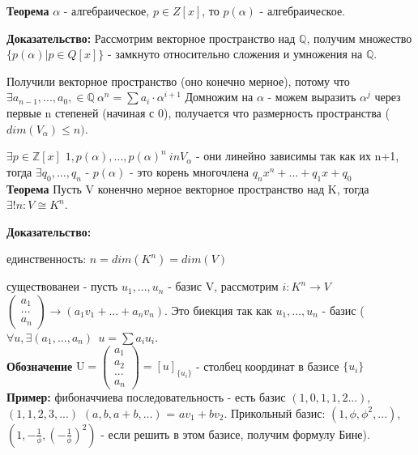 \documentclass[12pt]{article}
\begin{document}
\textbf{Теорема} $\alpha$ - алгебраическое, $ p \in Z[x]$, то  $p(\alpha)$ - алгебраическое.

\textbf{Доказательство:} Рассмотрим векторное пространство над $\mathbb{Q}$, получим множество $\{p(\alpha) | p \in Q[x]\}$ - замкнуто относительно сложения и умножения на $\mathbb{Q}$.

Получили векторное пространство (оно конечно мерное), потому что $\exists a_{n - 1}, ..., a_0, \in \mathbb{Q} \ \alpha^n = \sum {a_i \cdot \alpha^{i + 1}}$ Домножим на $\alpha$ - можем выразить $\alpha^j$ через первые n степеней (начиная с 0), получается что размерность пространства ($dim(V_{\alpha}) \leq n)$. 

$\exists p \in \mathbb{Z}[x]$ $1, p(\alpha), ..., p(\alpha)^n \ in V_{\alpha}$ - они линейно зависимы так как их n+1, тогда $\exists q_0, ..., q_n$ - $p(\alpha)$ - это корень многочлена $q_nx^n + ... + q_1x + q_0$
\\

\textbf{Теорема} Пусть V коненчно мерное векторное пространство над K, тогда $\exists !n : V \cong K^n$. 

\textbf{Доказательство:}

единственность: $n = dim(K^n) = dim(V)$ 

существованеи - пусть $u_1, ..., u_n$ - базис V, рассмотрим $i: K^n \rightarrow V$ $\begin{pmatrix}
    a_1 \\
    ... \\
    a_n
\end{pmatrix} \rightarrow (a_1v_1 + ... + a_nv_n)$. Это биекция так как $u_1, ..., u_n$ - базис ($\forall u, \exists (a_1, ..., a_n) \ \ u = \sum a_i u_i$.
\\

\textbf{Обозначение} $\mathrm{U} = \begin{pmatrix}
    a_1 \\
    a_2 \\
    ... \\
    a_n 
\end{pmatrix} = [u]_{\{u_i\}}$ - столбец координат в базисе $\{ u_i \}$
\\

\textbf{Пример:} фибоначчиева последовательность - есть базис $(1, 0, 1, 1, 2 ...)$, $(1, 1, 2, 3, ... )$ $(a, b, a + b, ...)$ = $av_1 + b v_2$. Прикольный базис: $(1, \phi, \phi^2, ...)$, $(1, -\frac{1}{\phi}, (-\frac{1}{\phi})^2)$ - если решить в этом базисе, получим формулу Бине).
\\
\end{document}
